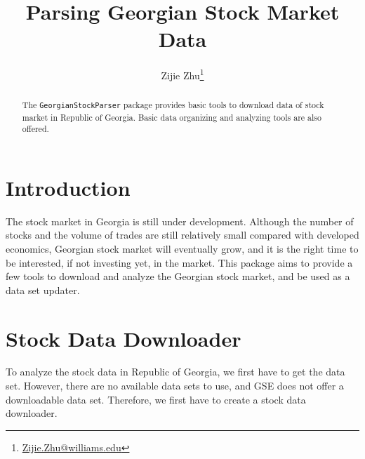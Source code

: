 \documentclass[a4paper]{article}
\begin{document}





\renewcommand\Authfont{\fontsize{12}{14.4}\selectfont}
\renewcommand\Affilfont{\fontsize{9}{10.8}\itshape}

\title{\textbf{Parsing Georgian Stock Market Data}}
\author{Zijie Zhu\thanks{\href{mailto:Zijie.Zhu@williams.edu}{Zijie.Zhu@williams.edu}}}
\maketitle


\tableofcontents

\begin{abstract}
The \texttt{GeorgianStockParser} package provides basic tools to download data of stock market in Republic of Georgia. Basic data organizing and analyzing tools are also offered.
\end{abstract}

\section{Introduction}
\label{sec:Introduction}

The stock market in Georgia is still under development. Although the number of stocks and the volume of trades are still relatively small compared with developed economics, Georgian stock market will eventually grow, and it is the right time to be interested, if not investing yet, in the market. This package aims to provide a few tools to download and analyze the Georgian stock market, and be used as a data set updater.

\section{Stock Data Downloader}
\label{sec:Downloader}

To analyze the stock data in Republic of Georgia, we first have to get the data set. However, there are no available data sets to use, and GSE does not offer a downloadable data set. Therefore, we first have to create a stock data downloader.
\end{document}
